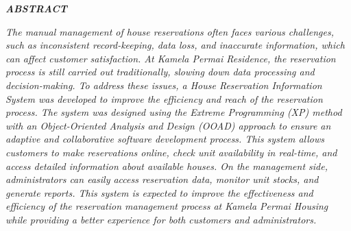 %


%
\fontsize{12}{14.4}
\begin{center}\MakeUppercase{\textbf{\emph{Abstract}}}\end{center}

\noindent
\fontsize{10pt}{12pt}\selectfont
\emph{The manual management of house reservations often faces various challenges, such as inconsistent record-keeping, data loss, and inaccurate information, which can affect customer satisfaction. At Kamela Permai Residence, the reservation process is still carried out traditionally, slowing down data processing and decision-making. To address these issues, a House Reservation Information System was developed to improve the efficiency and reach of the reservation process. The system was designed using the Extreme Programming (XP) method with an Object-Oriented Analysis and Design (OOAD) approach to ensure an adaptive and collaborative software development process. This system allows customers to make reservations online, check unit availability in real-time, and access detailed information about available houses. On the management side, administrators can easily access reservation data, monitor unit stocks, and generate reports. This system is expected to improve the effectiveness and efficiency of the reservation management process at Kamela Permai Housing while providing a better experience for both customers and administrators.}\\
 \\

